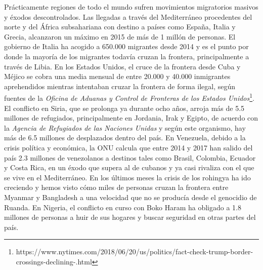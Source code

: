\vspace{-0.2cm}
Pr\'acticamente regiones de todo el mundo sufren movimientos migratorios masivos y \'exodos descontrolados. Las llegadas a trav\'es del Mediterr\'aneo procedentes del norte y del \'Africa subsahariana con destino a pa\'ises como Espa\~na, Italia y Grecia, alcanzaron un m\'aximo en 2015 de m\'as de 1 mill\'on de personas. El gobierno de Italia ha acogido a 650.000 migrantes desde 2014 y es el punto por donde la mayor\'ia de los migrantes todav\'ia cruzan la frontera, principalmente a trav\'es de Libia. En los Estados Unidos, el cruce de la frontera desde Cuba y M\'ejico se cobra una media mensual de entre 20.000 y 40.000 inmigrantes aprehendidos mientras intentaban cruzar la frontera de forma ilegal, seg\'un fuentes de la \textit{Oficina de Aduanas y Control de Fronteras de los Estados Unidos}\footnote{https://www.nytimes.com/2018/06/20/us/politics/fact-check-trump-border-crossings-declining-.html}. El conflicto en Siria, que se prolonga ya durante ocho a\~nos, arroja m\'as de 5.5 millones de refugiados, principalmente en Jordania, Irak y Egipto, de acuerdo con la \textit{Agencia de Refugiados de las Naciones Unidas} y seg\'un este organismo, hay m\'as de 6.5 millones de desplazados dentro del pa\'is. En Venezuela, debido a la crisis pol\'itica y econ\'omica, la ONU calcula que entre 2014 y 2017 han salido del pa\'is 2.3 millones de venezolanos a destinos tales como Brasil, Colombia, Ecuador y Costa Rica, en un \'exodo que supera al de cubanos y ya casi rivaliza con el que se vive en el Mediterr\'aneo. En los \'ultimos meses la crisis de los rohingya ha ido creciendo y hemos visto c\'omo miles de personas cruzan la frontera entre Myanmar y Bangladesh a una velocidad que no se produc\'ia desde el genocidio de Ruanda. En Nigeria, el conflicto en curso con Boko Haram ha obligado a 1.8 millones de personas a huir de sus hogares y buscar seguridad en otras partes del pa\'is.\\ 

